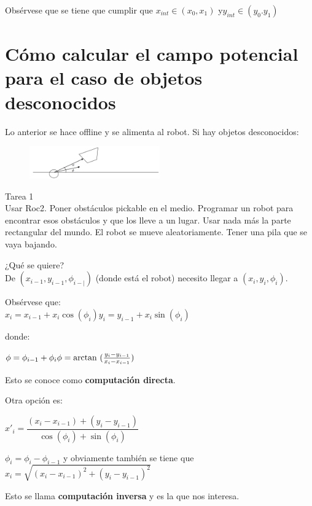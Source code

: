 Obsérvese que se tiene que cumplir que $x_{int} \in(x_0,x_1)$ y$y_{int} \in(y_0.y_1)$

\section{Cómo calcular el campo potencial para el caso de objetos desconocidos}

Lo anterior se hace offline y se alimenta al robot. Si hay objetos desconocidos:

\begin{figure}[h!]
	\centering
	\includegraphics[width=0.5\textwidth]{images/img62.png}
	\label{figura62}
\end{figure}

\begin{scaja}
Tarea 1 \\
Usar Roc2. Poner obstáculos pickable en el medio. Programar un robot para encontrar esos obstáculos y que
los lleve a un lugar. Usar nada más la parte rectangular del mundo. El robot se mueve aleatoriamente. Tener
una pila que se vaya bajando.
\end{scaja}



¿Qué se quiere? \\
De $(x_{i-1},y_{i-1},\phi_{i-|})$ (donde está el robot) necesito llegar a $(x_i,y_i,\phi_i)$.

Obsérvese que: \\
 $x_i=x_{i-1}+x_i \cos(\phi_i)
 y_i=y_{i-1}+x_i \sin(\phi_i)
 $
 
donde:

$
\phi=\phi_{i-1}+\phi_i \\
\phi=\arctan\ (\frac{y_i -y_{i-1}}{x_i -x_{i-1}})
$


Esto se conoce como \textbf{computación directa}.

Otra opción es:

$
x'_i= \dfrac{(x_i - x_{i-1}) + (y_i - y_{i-1})}{\cos(\phi_i) + \sin(\phi_i)}
$

$
\phi_i = \phi_i - \phi_{i-1}
$
y obviamente también se tiene que $x_i = \sqrt{(x_i - x_{i-1})^2 + (y_i - y_{i-1})^2 }$



Esto se llama \textbf{computación inversa} y es la que nos interesa.



